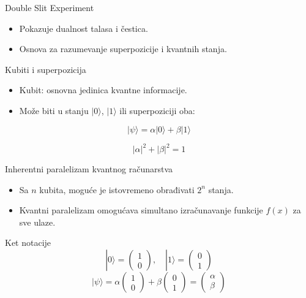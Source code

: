 \documentclass[aspectratio=169]{beamer}
\begin{document}
\begin{frame}{Double Slit Experiment}
\begin{itemize}
    \item Pokazuje dualnost talasa i čestica.
    \item Osnova za razumevanje superpozicije i kvantnih stanja.
\end{itemize}
\end{frame}

\begin{frame}{Kubiti i superpozicija}
\begin{itemize}
    \item Kubit: osnovna jedinica kvantne informacije.
    \item Može biti u stanju $|0\rangle$, $|1\rangle$ ili superpoziciji oba:
\end{itemize}

\[
|\psi\rangle = \alpha|0\rangle + \beta|1\rangle
\]

\[
|\alpha|^2 + |\beta|^2 = 1
\]
\end{frame}

\begin{frame}{Inherentni paralelizam kvantnog računarstva}
\begin{itemize}
    \item Sa $n$ kubita, moguće je istovremeno obrađivati $2^n$ stanja.
    \item Kvantni paralelizam omogućava simultano izračunavanje funkcije $f(x)$ za sve ulaze.
\end{itemize}
\end{frame}

\begin{frame}{Ket notacije}
\[
|0\rangle = \begin{pmatrix} 1 \\ 0 \end{pmatrix}, \quad
|1\rangle = \begin{pmatrix} 0 \\ 1 \end{pmatrix}
\]
\[
|\psi\rangle = \alpha \begin{pmatrix}1 \\ 0\end{pmatrix} + \beta \begin{pmatrix}0 \\ 1\end{pmatrix}
= \begin{pmatrix}\alpha \\ \beta\end{pmatrix}
\]
\end{frame}
\end{document}
